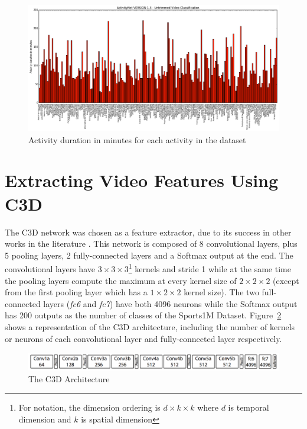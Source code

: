 \begin{figure}[ht]
\begin{center}
\includegraphics[width=1\linewidth]{img/methodology/dataset_stats}
\end{center}
\caption{Activity duration in minutes for each activity in the dataset}
\label{fig:dataset_stats}
\end{figure}

\section{Extracting Video Features Using C3D}

The C3D network\cite{tran2014learning} was chosen as a feature extractor, due to its success in other works in the literature \cite{baccouche2011sequential,tran2015deep,tran2014learning,shoutemporal}. This network is composed of 8 convolutional layers, plus 5 pooling layers, 2 fully-connected layers and a Softmax output at the end. The convolutional layers have $3 \times 3 \times 3$\footnote{For notation, the dimension ordering is $d \times k \times k$ where $d$ is temporal dimension and $k$ is spatial dimension} kernels and stride 1 while at the same time the pooling layers compute the maximum at every kernel size of $2 \times 2 \times 2$ (except from the first pooling layer which has a $1 \times 2 \times 2$ kernel size). The two full-connected layers (\textit{fc6} and \textit{fc7}) have both 4096 neurons while the Softmax output has 200 outputs as the number of classes of the Sports1M Dataset. Figure~\ref{fig:c3d_architecture} shows a representation of the C3D architecture, including the number of kernels or neurons of each convolutional layer and fully-connected layer respectively.

\begin{figure}[H]
\begin{center}
\includegraphics[width=1\linewidth]{img/methodology/c3d_architecture}
\end{center}
\caption{The C3D Architecture}
\label{fig:c3d_architecture}
\end{figure}

